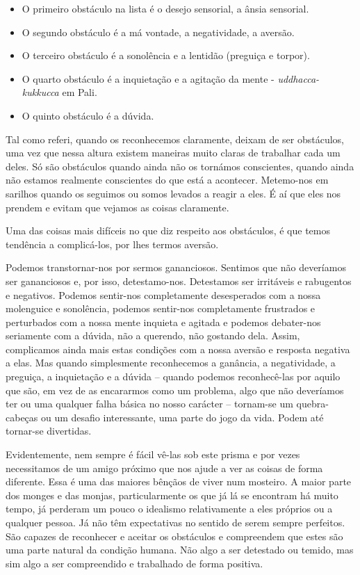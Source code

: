 
\begin{itemize}
  \item O primeiro obstáculo na lista é o desejo sensorial, a ânsia sensorial.
  \item O segundo obstáculo é a má vontade, a negatividade, a aversão.
  \item O terceiro obstáculo é a sonolência e a lentidão (preguiça e torpor).
  \item O quarto obstáculo é a inquietação e a agitação da mente - \emph{uddhacca-kukkucca} em Pali.
  \item O quinto obstáculo é a dúvida.
\end{itemize}

Tal como referi, quando os reconhecemos claramente, deixam de ser
obstáculos, uma vez que nessa altura existem maneiras muito claras de
trabalhar cada um deles. Só são obstáculos quando ainda não os tornámos
conscientes, quando ainda não estamos realmente conscientes do que está
a acontecer. Metemo-nos em sarilhos quando os seguimos ou somos levados
a reagir a eles. É aí que eles nos prendem e evitam que vejamos as
coisas claramente.

Uma das coisas mais difíceis no que diz respeito aos obstáculos, é que
temos tendência a complicá-los, por lhes termos aversão.

Podemos transtornar-nos por sermos gananciosos. Sentimos que não
deveríamos ser gananciosos e, por isso, detestamo-nos. Detestamos ser
irritáveis e rabugentos e negativos. Podemos sentir-nos completamente
desesperados com a nossa molenguice e sonolência, podemos sentir-nos
completamente frustrados e perturbados com a nossa mente inquieta e
agitada e podemos debater-nos seriamente com a dúvida, não a querendo,
não gostando dela. Assim, complicamos ainda mais estas condições com a
nossa aversão e resposta negativa a elas. Mas quando simplesmente
reconhecemos a ganância, a negatividade, a preguiça, a inquietação e a
dúvida -- quando podemos reconhecê-las por aquilo que são, em vez de as
encararmos como um problema, algo que não deveríamos ter ou uma qualquer
falha básica no nosso carácter -- tornam-se um quebra-cabeças ou um
desafio interessante, uma parte do jogo da vida. Podem até tornar-se
divertidas.

Evidentemente, nem sempre é fácil vê-las sob este prisma e por vezes
necessitamos de um amigo próximo que nos ajude a ver as coisas de forma
diferente. Essa é uma das maiores bênçãos de viver num mosteiro. A maior
parte dos monges e das monjas, particularmente os que já lá se encontram
há muito tempo, já perderam um pouco o idealismo relativamente a eles
próprios ou a qualquer pessoa. Já não têm expectativas no sentido de
serem sempre perfeitos. São capazes de reconhecer e aceitar os
obstáculos e compreendem que estes são uma parte natural da condição
humana. Não algo a ser detestado ou temido, mas sim algo a ser
compreendido e trabalhado de forma positiva.

